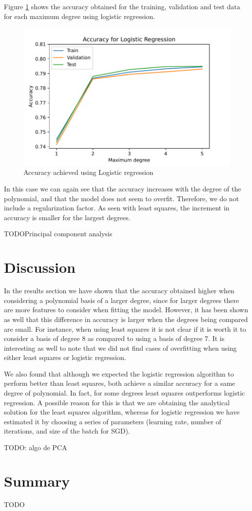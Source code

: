 \documentclass[10pt,conference,compsocconf]{IEEEtran}
\begin{document}
    Figure \ref{fig:2LRprec} shows the accuracy obtained for the training, validation and test data for each maximum degree using logistic regression.

    \begin{figure}[htp]
      \centering
      \includegraphics[width=.45\textwidth]{2LRprec}
      \caption{Accuracy achieved using Logistic regression}
      \label{fig:2LRprec}
    \end{figure}

    In this case we can again see that the accuracy increases with the degree of the polynomial, and that the model does not seem to overfit. Therefore, we do not include a regularization factor. As seen with least squares, the increment in accuracy is smaller for the largest degrees.

    TODOPrincipal component analysis

\section{Discussion}
\label{sec:discussion}
  In the results section we have shown that the accuracy obtained higher when considering a polynomial basis of a larger degree, since for larger degrees there are more features to consider when fitting the model. However, it has been shown as well that this difference in accuracy is larger when the degrees being compared are small. For instance, when using least squares it is not clear if it is worth it to consider a basis of degree $8$ as compared to using a basis of degree $7$. It is interesting as well to note that we did not find cases of overfitting when using either least squares or logistic regression.

  We also found that although we expected the logistic regression algorithm to perform better than least squares, both achieve a similar accuracy for a same degree of polynomial. In fact, for some degrees least squares outperforms logistic regression. A possible reason for this is that we are obtaining the analytical solution for the least squares algorithm, whereas for logistic regression we have estimated it by choosing a series of parameters (learning rate, number of iterations, and size of the batch for SGD).

  TODO: algo de PCA

\section{Summary}
\label{sec:tips-writing}

TODO



\end{document}
